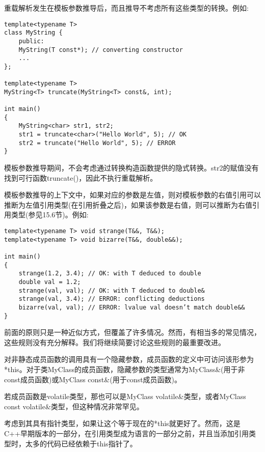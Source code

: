重载解析发生在模板参数推导后，而且推导不考虑所有这些类型的转换。例如:

\begin{lstlisting}[style=styleCXX]
template<typename T>
class MyString {
	public:
	MyString(T const*); // converting constructor
	...
};

template<typename T>
MyString<T> truncate(MyString<T> const&, int);

int main()
{
	MyString<char> str1, str2;
	str1 = truncate<char>("Hello World", 5); // OK
	str2 = truncate("Hello World", 5); // ERROR
}
\end{lstlisting}

模板参数推导期间，不会考虑通过转换构造函数提供的隐式转换。str2的赋值没有找到可行函数truncate()，因此不执行重载解析。

模板参数推导的上下文中，如果对应的参数是左值，则对模板参数的右值引用可以推断为左值引用类型(在引用折叠之后)，如果该参数是右值，则可以推断为右值引用类型(参见15.6节)。例如:

\begin{lstlisting}[style=styleCXX]
template<typename T> void strange(T&&, T&&);
template<typename T> void bizarre(T&&, double&&);

int main()
{
	strange(1.2, 3.4); // OK: with T deduced to double
	double val = 1.2;
	strange(val, val); // OK: with T deduced to double&
	strange(val, 3.4); // ERROR: conflicting deductions
	bizarre(val, val); // ERROR: lvalue val doesn’t match double&&
}
\end{lstlisting}

前面的原则只是一种近似方式，但覆盖了许多情况。然而，有相当多的常见情况，这些规则没有充分解释。我们将继续简要讨论这些规则的最重要改进。


对非静态成员函数的调用具有一个隐藏参数，成员函数的定义中可访问该形参为*this。对于类MyClass的成员函数，隐藏参数的类型通常为MyClass\&(用于非const成员函数)或MyClass const\&(用于const成员函数)。

\begin{tcolorbox}[colback=webgreen!5!white,colframe=webgreen!75!black]
\hspace*{0.75cm}若成员函数是volatile类型，那也可以是MyClass volatile\&类型，或者MyClass const volatile\&类型，但这种情况非常罕见。
\end{tcolorbox}

考虑到其具有指针类型，如果让这个等于现在的*this就更好了。然而，这是C++早期版本的一部分，在引用类型成为语言的一部分之前，并且当添加引用类型时，太多的代码已经依赖于this指针了。

